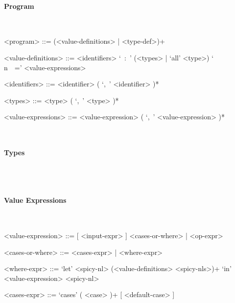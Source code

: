 \documentclass{article}
\begin{document}
\setlength{\grammarparsep}{20pt}
\setlength{\grammarindent}{12em}

\paragraph{Program}
\hspace{1cm}\\
\begin{grammar}

<program> ::= (<value-definitions> | <type-def>)+

<value-definitions> ::=
<identifiers> `\ :\ ' (<types> | `all' <type>) `\\n\ \ =' <value-expressions>

<identifiers> ::= <identifier> ( `,\ ' <identifier> )*  

<types> ::= <type> ( `,\ ' <type> )*  

<value-expressions> ::= <value-expression> ( `,\ ' <value-expression> )*  

\end{grammar}
\hspace{1cm}\\

\paragraph{Types}

\hspace{1cm}\\


\hspace{1cm}\\

\paragraph{Value Expressions}

\hspace{1cm}\\
\begin{grammar}

<value-expression> ::= [ <input-expr> ] <cases-or-where> | <op-expr>

<cases-or-where> ::= <cases-expr> | <where-expr>

<where-expr> ::=
`let' <spicy-nl> (<value-definitions> <spicy-nls>)+ `in' <value-expression> <spicy-nl>

<cases-expr> ::= `cases' ( <case> )+ [ <default-case> ]

\end{grammar}
\end{document}
